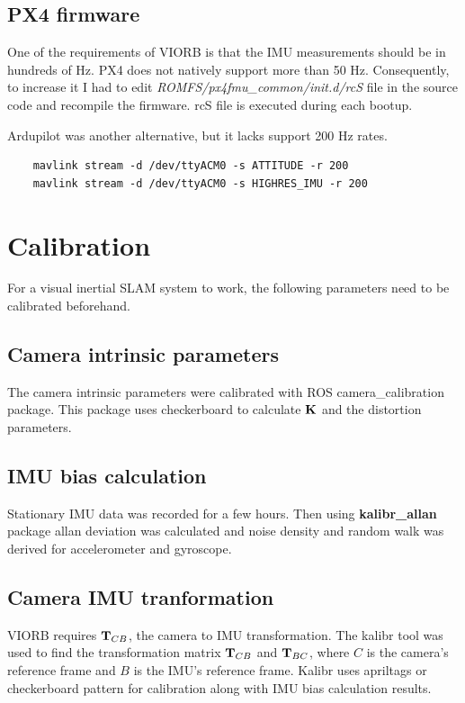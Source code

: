\subsection{PX4 firmware}
One of the requirements of VIORB is that the IMU measurements should be in hundreds of Hz. PX4 does not natively support more than 50 Hz. Consequently, to increase it I had to edit \textit{ROMFS/px4fmu\_common/init.d/rcS} file in the source code and recompile the firmware.
rcS file is executed during each bootup.

Ardupilot was another alternative, but it lacks support 200 Hz rates.

\begin{lstlisting}
	mavlink stream -d /dev/ttyACM0 -s ATTITUDE -r 200        
	mavlink stream -d /dev/ttyACM0 -s HIGHRES_IMU -r 200
\end{lstlisting}

\section{Calibration}
For a visual inertial SLAM system to work, the following parameters need to be calibrated beforehand.
 
\subsection{Camera intrinsic parameters}
The camera intrinsic parameters were calibrated with ROS camera\_calibration package. This package uses checkerboard to calculate ${\bf K}$ and the distortion parameters.

\subsection{IMU bias calculation} \label{section:imu_bias_calculation}
Stationary IMU data was recorded for a few hours. Then using \textbf{kalibr\_allan} package allan deviation was calculated and noise density and random walk was derived for accelerometer and gyroscope. 

\subsection{Camera IMU tranformation}
VIORB requires ${\bf T}_{CB}$, the camera to IMU transformation. The kalibr tool was used to find the transformation matrix ${\bf T}_{CB}$ and ${\bf T}_{BC}$, where $C$ is the camera's reference frame and $B$ is the IMU's reference frame. Kalibr uses apriltags or checkerboard pattern for calibration along with IMU bias calculation results. 

